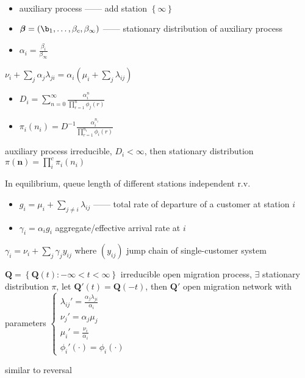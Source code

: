 \begin{example}\,
    \begin{itemize}
        \item auxiliary process ------ add station $\left\{ \infty \right\}$
        \item $\bm \beta = (\b_1, \dots, \beta_c, \beta_\infty)$ ------ stationary distribution of auxiliary process
        \item $\alpha_i = \frac{\beta_i}{\beta_\infty} $
    \end{itemize}
    \begin{fact}
        $\nu_i + \sum_j \alpha_j \lambda_{ji} = \alpha_i\left(\mu_i + \sum_j \lambda_{ij}\right)$
    \end{fact}
    \begin{itemize}
        \item $D_i = \sum^\infty_{n=0} \frac{\alpha_i^n}{\prod_{r=1}^n \phi_j(r)}$
        \item $\pi_i(n_i) = D^{-1} \frac{\alpha_i^{n_i}}{\prod^{n_i}_{r=1}\phi_i(r)}$
    \end{itemize}
    \begin{thm}
        auxiliary process irreducible, $D_i < \infty$, then stationary distribution $\pi(\bm n) = \prod^c_i \pi_i(n_i)$
    \end{thm}
\end{example}

\begin{fact}
    In equilibrium, queue length of different stations independent r.v.\
\end{fact}

\begin{itemize}
    \item $g_i = \mu_i + \sum_{j \neq i}\lambda_{ij}$ ------ total rate of departure of a customer at station $i$
    \item $\gamma_i = \alpha_i g_i$ \dash aggregate/effective arrival rate at $i$
\end{itemize}

\begin{fact}
    $\gamma_i = \nu_i + \sum_j \gamma_j y_{ij}$ where $(y_{ij})$ jump chain of single-customer system
\end{fact}

\begin{thm}
    $\bm Q = \left\{ \bm Q(t) : -\infty < t < \infty \right\}$ irreducible open migration process, $\exists$ stationary distribution $\pi$,
    let $\bm Q'(t) = \bm Q(-t)$, then $\bm Q'$ open migration network with parameters
    $\begin{cases}
         \lambda_{ij}' = \frac{\alpha_j \lambda_{ji}}{\alpha_i}\\
         \nu_j' = \alpha_j \mu_j\\
         \mu_i' = \frac{\nu_i}{\alpha_{i}}\\
         \phi_i'(\cdot) = \phi_i(\cdot)
    \end{cases}$
\end{thm}
\begin{pf}
    similar to reversal
\end{pf}

